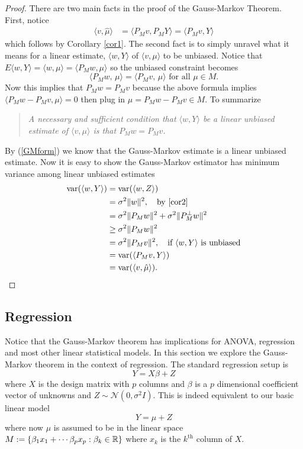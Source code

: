 \documentclass[11pt]{report}
\begin{document}
\begin{proof}
There are two main facts in the proof of the Gauss-Markov Theorem. First, notice 
\begin{align}
\langle v,\hat\mu\rangle &= \langle P_Mv,P_M Y \rangle = \langle P_Mv,Y \rangle \label{GMform}
\end{align}
which follows by Corollary \ref{cor1}. 
The second fact is to simply unravel what it means for a linear estimate, $\langle w,Y\rangle$ of $\langle v,\mu\rangle$ to be unbiased. Notice that $E\langle w,Y\rangle = \langle w, \mu\rangle= \langle P_M w, \mu\rangle$ so the unbiased constraint becomes
\begin{equation}
\langle P_Mw,\, \mu\rangle =  \langle P_M v,\, \mu\rangle\text{ for all $\mu\in M$}.
\end{equation} 
Now this implies that $P_Mw = P_Mv$ because the above formula implies $\langle  P_Mw - P_Mv, \mu \rangle = 0$ then plug in $\mu = P_Mw - P_Mv\in M$. To summarize
\begin{quote}
\em
A necessary and sufficient condition that $\langle w, Y\rangle$ be a linear unbiased estimate of $\langle v, \mu\rangle$ is that $P_M w = P_M v$.
\end{quote}
By (\ref{GMform}) we know that the Gauss-Markov estimate is a linear unbiased estimate.
Now it is easy to show the Gauss-Markov estimator has minimum variance among linear unbiased estimates
\begin{align*}
\text{var}(\langle w, Y\rangle) &= \text{var}(\langle w, Z\rangle) \\
 &= \sigma^2\|w \|^2, \quad\text{by \ref{cor2}} \\
 &= \sigma^2\|P_Mw \|^2 + \sigma^2\|P_M^\perp w \|^2\\
 &\geq \sigma^2\|P_Mw \|^2 \\
 & = \sigma^2\|P_M v \|^2,\quad\text{if $\langle w, Y\rangle$ is unbiased} \\
 & = \text{var}(\langle P_M v, Y\rangle) \\
 & = \text{var}(\langle v, \hat\mu\rangle).
\end{align*}

\end{proof}


\subsection{Regression}
Notice that the Gauss-Markov theorem has implications for ANOVA, regression and most other linear statistical models. In this section we explore the Gauss-Markov theorem in the context of regression. The standard regression setup is 
\[
Y = X \beta + Z
\]
where $X$ is the design matrix with $p$ columns  and $\beta$ is a $p$ dimensional coefficient vector of unknowns and $Z\sim \mathcal N(0,\sigma^2 I)$. This is indeed equivalent to our basic linear model
\[Y = \mu + Z \]
where now $\mu$ is assumed to be in the linear space $M:= \{ \beta_1 x_1+\cdots \beta_p x_p:\beta_k\in \Bbb R\}$ where $x_k$ is the $k^\text{th}$ column of $X$. 
\end{document}
